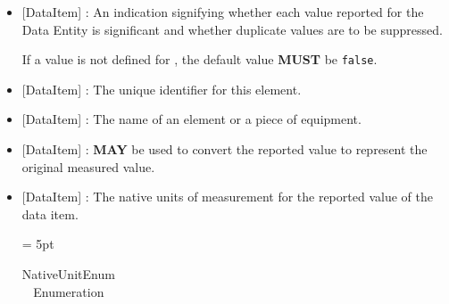 \begin{itemize}
\FloatBarrier
\item {}[DataItem] : An indication signifying whether each value reported for the \gls{Data Entity} is significant and whether duplicate values are to be suppressed.

If a value is not defined for , the default value \textbf{MUST} be \texttt{false}.
\item {}[DataItem] : The unique identifier for this element.
\item {}[DataItem] : The name of an element or a piece of equipment.
\item {}[DataItem] :  \textbf{MAY} be used to convert the reported value to represent the original measured value.
\item {}[DataItem] : The native units of measurement for the reported value of the data item.

\tabulinesep = 5pt
\begin{longtabu} to \textwidth {
    |l|X|}
  \caption{NativeUnitEnum Enumeration}
  \label{enum:NativeUnitEnum} \\


\end{longtabu}
\end{itemize}

